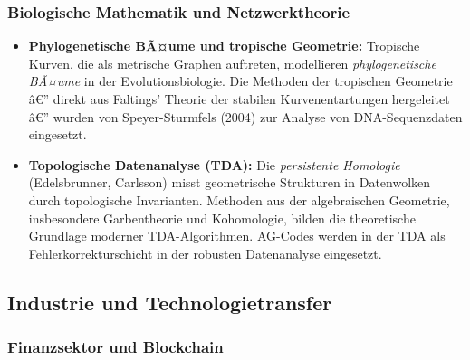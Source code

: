 ﻿\documentclass[12pt,a4paper]{article}
\theoremstyle{plain}
\theoremstyle{definition}
\theoremstyle{remark}
\begin{document}
\subsubsection{Biologische Mathematik und Netzwerktheorie}

\begin{itemize}[leftmargin=2em,itemsep=4pt]
  \item \textbf{Phylogenetische BÃ¤ume und tropische Geometrie:}
    Tropische Kurven, die als metrische Graphen auftreten, modellieren
    \emph{phylogenetische BÃ¤ume} in der Evolutionsbiologie.
    Die Methoden der tropischen Geometrie â€” direkt aus Faltings' Theorie
    der stabilen Kurvenentartungen hergeleitet â€” wurden von Speyer-Sturmfels (2004)
    zur Analyse von DNA-Sequenzdaten eingesetzt.

  \item \textbf{Topologische Datenanalyse (TDA):}
    Die \emph{persistente Homologie} (Edelsbrunner, Carlsson) misst geometrische
    Strukturen in Datenwolken durch topologische Invarianten. Methoden aus der
    algebraischen Geometrie, insbesondere Garbentheorie und Kohomologie,
    bilden die theoretische Grundlage moderner TDA-Algorithmen.
    AG-Codes werden in der TDA als Fehlerkorrekturschicht in der
    robusten Datenanalyse eingesetzt.
\end{itemize}

\subsection{Industrie und Technologietransfer}

\subsubsection{Finanzsektor und Blockchain}
\end{document}
